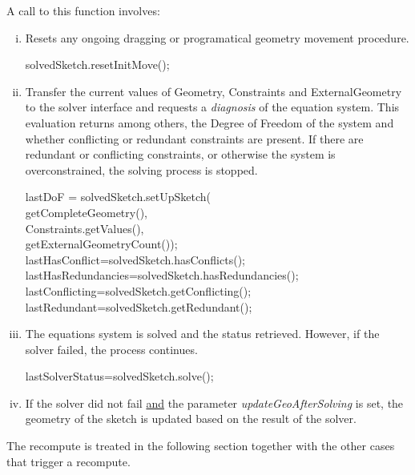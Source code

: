 \documentclass[12pt,twoside,a4paper]{book}
\begin{document}
    A call to this function involves:
    \begin{enumerate}[(i)]
     \item Resets any ongoing dragging or programatical geometry movement procedure.
        \begin{codequote}
        solvedSketch.resetInitMove();
        \end{codequote}
     \item Transfer the current values of Geometry, Constraints and ExternalGeometry to the solver interface and requests a \emph{diagnosis} of the equation system. This evaluation returns among others, the Degree of Freedom of the system and whether conflicting or redundant constraints are present. If there are redundant or conflicting constraints, or otherwise the system is overconstrained, the solving process is stopped.
        \begin{codequote}
        lastDoF = solvedSketch.setUpSketch(\\
        \-\hspace{2.5cm}getCompleteGeometry(),\\
        \-\hspace{2.5cm}Constraints.getValues(),\\
        \-\hspace{2.5cm}getExternalGeometryCount());\\

        lastHasConflict=solvedSketch.hasConflicts();\\
        lastHasRedundancies=solvedSketch.hasRedundancies();\\
        lastConflicting=solvedSketch.getConflicting();\\
        lastRedundant=solvedSketch.getRedundant();
        \end{codequote}
     \item The equations system is solved and the status retrieved. However, if the solver failed, the process continues.
       \begin{codequote}
        lastSolverStatus=solvedSketch.solve();
        \end{codequote}
     \item If the solver did not fail \underline{and} the parameter \emph{updateGeoAfterSolving} is set, the geometry of the sketch is updated based on the result of the solver.
    \end{enumerate}

    The recompute is treated in the following section together with the other cases that trigger a recompute.
\end{document}
